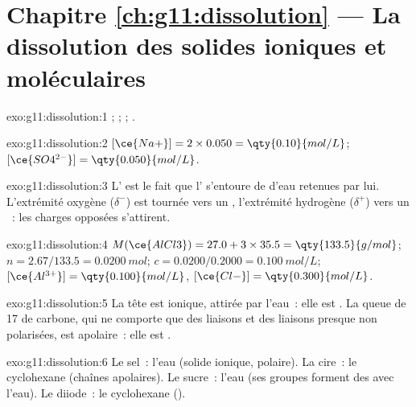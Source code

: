 \section*{Chapitre \ref{ch:g11:dissolution} --- La dissolution des solides ioniques et moléculaires}

\begin{solution}{exo:g11:dissolution:1}
;
;
;
.
\end{solution}

\begin{solution}{exo:g11:dissolution:2}
$[\ce{Na+}] = 2 \times 0.050 = \qty{0.10}{mol/L}$;
$[\ce{SO4^{2-}}] = \qty{0.050}{mol/L}$.
\end{solution}

\begin{solution}{exo:g11:dissolution:3}
L' est le fait que l' s'entoure de  d'eau
retenues par lui. L'extrémité oxygène ($\delta^-$) est tournée vers un
, l'extrémité hydrogène ($\delta^+$) vers un ~: les charges
opposées s'attirent.
\end{solution}

\begin{solution}{exo:g11:dissolution:4}
$M(\ce{AlCl3}) = 27.0 + 3 \times 35.5 = \qty{133.5}{g/mol}$;
$n = 2.67 / 133.5 = \qty{0.0200}{mol}$; $c = 0.0200 / 0.2000 =
\qty{0.100}{mol/L}$; $[\ce{Al^{3+}}] = \qty{0.100}{mol/L}$,
$[\ce{Cl-}] = \qty{0.300}{mol/L}$.
\end{solution}

\begin{solution}{exo:g11:dissolution:5}
La tête  est ionique, attirée par l'eau~: elle est .
La queue de 17  de carbone, qui ne comporte que des liaisons
 et des liaisons  presque non polarisées, est apolaire~:
elle est .
\end{solution}

\begin{solution}{exo:g11:dissolution:6}
Le sel~: l'eau (solide ionique,  polaire). La cire~: le
cyclohexane (chaînes apolaires). Le sucre~: l'eau (ses groupes 
forment des  avec l'eau). Le diiode~: le cyclohexane
().
\end{solution}


